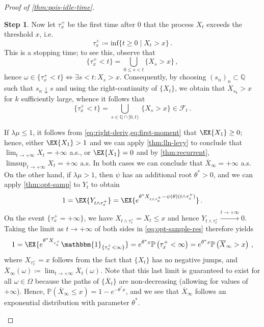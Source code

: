\documentclass[titlepage]{article}
\theoremstyle{plain}
\theoremstyle{definition}
\newtheorem{proofpart}{Step}
\DeclareRobustCommand{\probX}[2][{\mathbb{P}}]{\ensuremath{ {#1}\left( {#2} \right)}}
\begin{document}
\begin{proof}[Proof of \cref{thm:pois-idle-time}]
  \begin{proofpart}
    Now let $\tau^+_x$ be the first time after $0$ that the process $X_t$ exceeds the threshold $x$, i.e.\
    \begin{equation} \label{eq:first-passage}
      \tau^+_x \coloneqq \mathrm{inf}\{ t \geq 0 \mid X_t > x \} \,.
    \end{equation}
    This is a stopping time; to see this, observe that
    \begin{equation}
      \{ \tau_x^+ < t \} = \bigcup_{0 \leq s < t} \{ X_s > x \} \,,
    \end{equation}
    hence $\omega \in \{ \tau_x^+ < t \} \iff \exists s < t : X_s > x$. Consequently, by choosing $(s_n)_n \subset \mathbb{Q}$ such that $s_n \downarrow s$ and using the right-continuity of $\{ X_t \}$, we obtain that $X_{s_k} > x$ for $k$ sufficiently large, whence it follows that
    \begin{equation}
      \{ \tau_x^+ < t \} = \bigcup_{s \in \mathbb{Q} \cap [0, t)} \ \{ X_s > x \} \in \mathcal{F}_t \,.
    \end{equation}

    If $\lambda \mu \leq 1$, it follows from \cref{eq:right-deriv,eq:first-moment} that $\EX{X_1} \geq 0$; hence, either $\EX{X_1} > 1$ and we can apply \cref{thm:lln-levy} to conclude that $\lim_{t \to +\infty} X_t = +\infty$ a.s., or $\EX{X_1} = 0$ and by \cref{thm:recurrent}, $\limsup_{t \to +\infty} X_t = +\infty$ a.s. In both cases we can conclude that $\overline{X}_\infty = +\infty$ a.s. On the other hand, if $\lambda \mu > 1$, then $\psi$ has an additional root $\theta^* > 0$, and we can apply \cref{thm:opt-samp} to $Y_t$ to obtain
    \begin{equation} \label{eq:opt-sample-res}
      1 = \EX{Y_{t \wedge \tau^+_x}} = \EX{e^{\theta^* X_{t \wedge \tau^+_x} - \psi(\theta) (t \wedge \tau_x^+)}} \,.
    \end{equation}
    On the event $\{ \tau_x^+ = +\infty \}$, we have $X_{t \wedge \tau_x^+} = X_t \leq x$ and hence $Y_{t \wedge \tau_x^+} \xrightarrow{t \to +\infty} 0$. Taking the limit as $t \to +\infty$ of both sides in \cref{eq:opt-sample-res} therefore yields
    \begin{equation}
      1 = \EX{e^{\theta^* X_{\tau^+_x}} \mathbbm{1}_{\{\tau^+_x < \infty \}}} = e^{\theta^* x} \probX{\tau^+_x < \infty} = e^{\theta^* x} \probX{\overline{X}_\infty > x} \,,
    \end{equation}
    where $X_{\tau^+_x} = x$ follows from the fact that $\{ X_t \}$ has no negative jumps, and $\overline{X}_\infty(\omega) \coloneqq \lim_{t \to +\infty} \overline{X}_t(\omega)$. Note that this last limit is guaranteed to exist for all $\omega \in \Omega$ because the paths of $\{ \overline{X}_t \}$ are non-decreasing (allowing for values of $+\infty$). Hence, $\probX{\overline{X}_\infty \leq x} = 1 - e^{-\theta^* x}$, and we see that $\overline{X}_\infty$ follows an exponential distribution with parameter $\theta^*$.
  \end{proofpart}


\end{proof}
\end{document}
